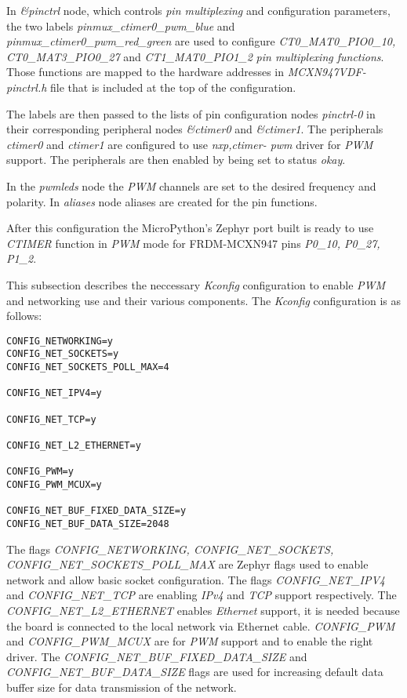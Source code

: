 \documentclass[twoside, 12pt]{article}
\begin{document}
In \textit{\&pinctrl} node, which controls \textit{pin multiplexing} and configuration 
parameters\cite{zephyr_start}, the two labels \textit{pinmux\_ctimer0\_pwm\_blue} and 
\textit{pinmux\_ctimer0\_pwm\_red\_green} are used to configure \textit{CT0\_MAT0\_PIO0\_10, 
CT0\_MAT3\_PIO0\_27} and \textit{CT1\_MAT0\_PIO1\_2} \textit{pin multiplexing functions}. 
Those functions are mapped to the hardware addresses in \textit{MCXN947VDF-pinctrl.h} file 
that is included at the top of the configuration.

The labels are then passed to the lists of pin configuration nodes \textit{pinctrl-0} in 
their corresponding peripheral nodes \textit{\&ctimer0} and \textit{\&ctimer1}. The 
peripherals \textit{ctimer0} and \textit{ctimer1} are configured to use \textit{nxp,ctimer-
pwm} driver for \textit{PWM} support. The peripherals are then enabled by being set to status \textit{okay}.

In the \textit{pwmleds} node the \textit{PWM} channels are set to the desired frequency and polarity. In \textit{aliases} node aliases are created for the pin functions.

After this configuration the MicroPython's Zephyr port built is ready to use \textit{CTIMER} function in \textit{PWM} mode for FRDM-MCXN947 pins \textit{P0\_10, P0\_27, P1\_2}.

This subsection describes the neccessary \textit{Kconfig} configuration to enable \textit{PWM} and networking use and their various components. The \textit{Kconfig} configuration is as follows:

\begin{lstlisting}[caption={Configuring PWM and networking support in MicroPython's Zephyr port with Kconfig},breaklines=true]
CONFIG_NETWORKING=y
CONFIG_NET_SOCKETS=y
CONFIG_NET_SOCKETS_POLL_MAX=4

CONFIG_NET_IPV4=y

CONFIG_NET_TCP=y

CONFIG_NET_L2_ETHERNET=y

CONFIG_PWM=y
CONFIG_PWM_MCUX=y

CONFIG_NET_BUF_FIXED_DATA_SIZE=y
CONFIG_NET_BUF_DATA_SIZE=2048 
\end{lstlisting}

The flags \textit{CONFIG\_NETWORKING, CONFIG\_NET\_SOCKETS, CONFIG\_NET\_SOCKETS\_POLL\_MAX} 
are Zephyr flags used to enable network and allow basic socket configuration. The flags 
\textit{CONFIG\_NET\_IPV4} and \textit{CONFIG\_NET\_TCP} are enabling \textit{IPv4} and 
\textit{TCP} support respectively. The \textit{CONFIG\_NET\_L2\_ETHERNET} enables 
\textit{Ethernet} support, it is needed because the board is connected to the local network
via Ethernet cable. \textit{CONFIG\_PWM} and \textit{CONFIG\_PWM\_MCUX} are for \textit{PWM}
support and to enable the right driver. The \textit{CONFIG\_NET\_BUF\_FIXED\_DATA\_SIZE} and 
\textit{CONFIG\_NET\_BUF\_DATA\_SIZE} flags are used for increasing default data buffer size 
for data transmission of the network. 
\end{document}
